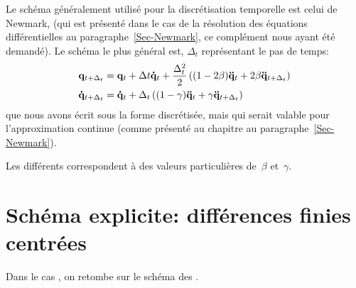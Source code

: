 \medskip
Le schéma généralement utilisé pour la discrétisation temporelle est celui de Newmark, (qui est présenté dans le cas de la résolution des équations différentielles au paragraphe~\ref{Sec-Newmark}, ce complément nous ayant été demandé).
Le schéma le plus général est, $\Delta_t$ représentant le pas de temps:
\begin{equation}
\begin{aligned}
&\VV{q}_{t+\Delta_t} = \VV{q}_t + \Delta t \VV{\dot q}_t + \frac{\Delta_t^2}2\left((1-2\beta)\VV{\ddot q}_t
+2\beta\VV{\ddot q}_{t+\Delta_t}\right) \\
&\VV{\dot q}_{t+\Delta_t} = \VV{\dot q}_t+\Delta_t\left((1-\gamma)\VV{\ddot q}_t+\gamma\VV{\ddot q}_{t+\Delta_t}
\right)
\end{aligned}
\end{equation}
que nous avons écrit sous la forme discrétisée, mais qui serait valable pour l'approximation continue (comme présenté au chapitre au paragraphe~\ref{Sec-Newmark}).

Les différents  correspondent à des valeurs particulières de~$\beta$ et~$\gamma$.



\bigskip
\section{Schéma explicite: différences finies centrées}

Dans le cas , on retombe sur le schéma des .


